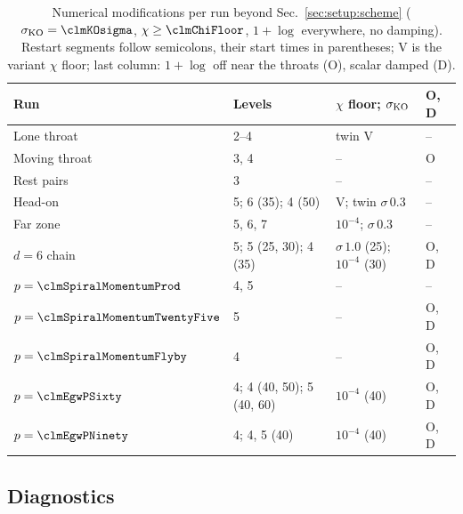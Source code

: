 \documentclass[twocolumn,floatfix,aps,prd,superscriptaddress,nofootinbib]{revtex4-2}
\begin{document}
\begin{table}[t]
\caption{Numerical modifications per run beyond Sec.~\ref{sec:setup:scheme} ($\sigma_{\rm KO}=\clmKOsigma$, $\chi\ge\clmChiFloor$, $1{+}\log$ everywhere, no damping). Restart segments follow semicolons, their start times in parentheses; V is the variant $\chi$ floor; last column: $1{+}\log$ off near the throats (O), scalar damped (D).}
\label{tab:mods}
\scriptsize
\setlength{\tabcolsep}{2pt}
\begin{ruledtabular}
\begin{tabular}{llll}
Run & Levels & $\chi$ floor; $\sigma_{\rm KO}$ & O, D \\
\hline
Lone throat & 2--4 & twin V & -- \\
Moving throat & 3, 4 & -- & O \\
Rest pairs & 3 & -- & -- \\
Head-on & 5; 6 (35); 4 (50) & V; twin $\sigma\,0.3$ & -- \\
Far zone & 5, 6, 7 & $10^{-4}$; $\sigma\,0.3$ & -- \\
$d=6$ chain & 5; 5 (25, 30); 4 (35) & $\sigma\,1.0$ (25); $10^{-4}$ (30) & O, D \\
$p=\clmSpiralMomentumProd$ & 4, 5 & -- & -- \\
$p=\clmSpiralMomentumTwentyFive$ & 5 & -- & O, D \\
$p=\clmSpiralMomentumFlyby$ & 4 & -- & O, D \\
$p=\clmEgwPSixty$ & 4; 4 (40, 50); 5 (40, 60) & $10^{-4}$ (40) & O, D \\
$p=\clmEgwPNinety$ & 4; 4, 5 (40) & $10^{-4}$ (40) & O, D \\
\end{tabular}
\end{ruledtabular}
\end{table}

\subsection{Diagnostics}
\label{sec:setup:diagnostics}
\end{document}
